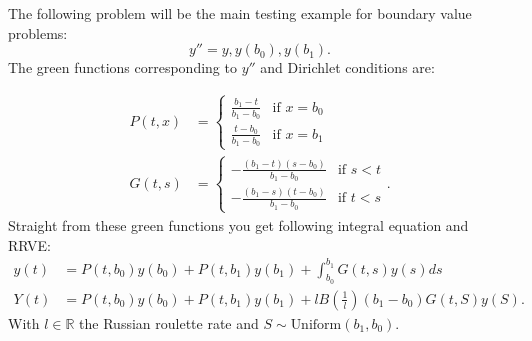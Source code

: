 \documentclass[a4paper,12pt]{article}
\begin{document}
\begin{example}[Dirichlet $y''=y$] \label{main dirichlet}
    The following problem will be the main testing example for
    boundary value problems:
    \begin{equation} \label{eq:main dirichlet}
        y''=y, y(b_{0}),y(b_{1}).
    \end{equation}
    The green functions corresponding to $y''$ and Dirichlet conditions are:

    \begin{align}
        P(t,x) & = \begin{cases}
                       \frac{b_{1}-t}{b_{1}-b_{0}} & \text{if } x = b_{0} \\
                       \frac{t-b_{0}}{b_{1}-b_{0}} & \text{if } x = b_{1}
                   \end{cases}       \\
        G(t,s) & = \begin{cases}
                       -\frac{(b_{1}-t)(s-b_{0})}{b_{1}-b_{0}} & \text{if } s<t \\
                       -\frac{(b_{1}-s)(t-b_{0})}{b_{1}-b_{0}} & \text{if } t<s
                   \end{cases}.
    \end{align}
    Straight from these green functions you get following integral equation and RRVE:
    \begin{align} \label{inteq:main dirichlet}
        y(t) & = P(t,b_{0}) y(b_{0}) + P(t,b_{1}) y(b_{1}) + \int_{b_{0}}^{b_{1}} G(t,s)y(s) ds \\
        Y(t) & = P(t,b_{0}) y(b_{0}) + P(t,b_{1}) y(b_{1})
        + l B\left(\frac{1}{l} \right)(b_{1}-b_{0}) G(t,S)y(S) . \label{RRVE:main dirichlet}
    \end{align}
    With $l \in \mathbb{R}$ the Russian roulette rate and $S \sim \text{Uniform}(b_{1},b_{0})$.

\end{example}
\end{document}
